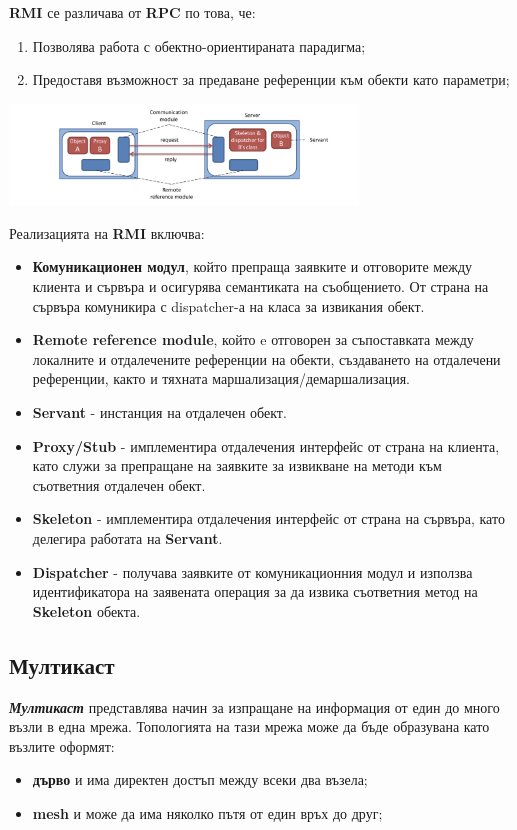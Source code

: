 \documentclass[fleqn,12pt]{article}
\begin{document}
\textbf{RMI} се различава от \textbf{RPC} по това, че:
\begin{enumerate}
    \item Позволява работа с обектно-ориентираната парадигма;
    \item Предоставя възможност за предаване референции към обекти като параметри;
\end{enumerate}

\begin{center}\includegraphics[width=350px]{rmi.png}\end{center}

Реализацията на \textbf{RMI} включва:
\begin{itemize}
    \item \textbf{Комуникационен модул}, който препраща заявките и отговорите между клиента и сървъра и осигурява семантиката на съобщението.
    От страна на сървъра комуникира с dispatcher-а на класа за извикания обект.
    \item \textbf{Remote reference module}, който e отговорен за съпоставката между локалните и отдалечените референции на обекти, създаването на отдалечени референции, както и тяхната маршализация/демаршализация.
    \item \textbf{Servant} - инстанция на отдалечен обект.
    \item \textbf{Proxy/Stub} - имплементира отдалечения интерфейс от страна на клиента, като служи за препращане на заявките за извикване на методи към съответния отдалечен обект. 
    \item \textbf{Skeleton} - имплементира отдалечения интерфейс от страна на сървъра, като делегира работата на \textbf{Servant}.
    \item \textbf{Dispatcher} - получава заявките от комуникационния модул и използва идентификатора на заявената операция за да извика съответния метод на \textbf{Skeleton} обекта.
\end{itemize}

\subsection{Мултикаст}

\textbf{\textit{Мултикаст}} представлява начин за изпращане на информация от един до много възли в една мрежа.
Топологията на тази мрежа може да бъде образувана като възлите оформят:
\begin{itemize}
    \item \textbf{дърво} и има директен достъп между всеки два възела;
    \item \textbf{mesh} и може да има няколко пътя от един връх до друг;
\end{itemize}
\end{document}
